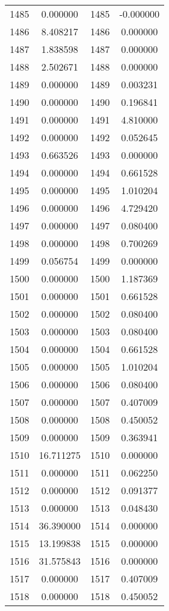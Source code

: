 \documentclass[12pt]{article}
\begin{document}
\begin{longtable}{@{}cccc@{}}
1485 & 0.000000 & 1485 & -0.000000 \\
1486 & 8.408217 & 1486 & 0.000000 \\
1487 & 1.838598 & 1487 & 0.000000 \\
1488 & 2.502671 & 1488 & 0.000000 \\
1489 & 0.000000 & 1489 & 0.003231 \\
1490 & 0.000000 & 1490 & 0.196841 \\
1491 & 0.000000 & 1491 & 4.810000 \\
1492 & 0.000000 & 1492 & 0.052645 \\
1493 & 0.663526 & 1493 & 0.000000 \\
1494 & 0.000000 & 1494 & 0.661528 \\
1495 & 0.000000 & 1495 & 1.010204 \\
1496 & 0.000000 & 1496 & 4.729420 \\
1497 & 0.000000 & 1497 & 0.080400 \\
1498 & 0.000000 & 1498 & 0.700269 \\
1499 & 0.056754 & 1499 & 0.000000 \\
1500 & 0.000000 & 1500 & 1.187369 \\
1501 & 0.000000 & 1501 & 0.661528 \\
1502 & 0.000000 & 1502 & 0.080400 \\
1503 & 0.000000 & 1503 & 0.080400 \\
1504 & 0.000000 & 1504 & 0.661528 \\
1505 & 0.000000 & 1505 & 1.010204 \\
1506 & 0.000000 & 1506 & 0.080400 \\
1507 & 0.000000 & 1507 & 0.407009 \\
1508 & 0.000000 & 1508 & 0.450052 \\
1509 & 0.000000 & 1509 & 0.363941 \\
1510 & 16.711275 & 1510 & 0.000000 \\
1511 & 0.000000 & 1511 & 0.062250 \\
1512 & 0.000000 & 1512 & 0.091377 \\
1513 & 0.000000 & 1513 & 0.048430 \\
1514 & 36.390000 & 1514 & 0.000000 \\
1515 & 13.199838 & 1515 & 0.000000 \\
1516 & 31.575843 & 1516 & 0.000000 \\
1517 & 0.000000 & 1517 & 0.407009 \\
1518 & 0.000000 & 1518 & 0.450052 \\

\end{longtable}
\end{document}
